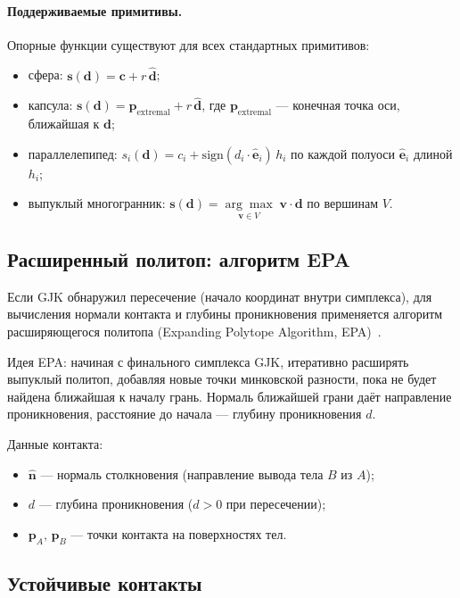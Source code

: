 \paragraph{Поддерживаемые примитивы.}
Опорные функции существуют для всех стандартных примитивов:
\begin{itemize}
  \item сфера: $\mathbf{s}(\mathbf{d}) = \mathbf{c} + r\,\hat{\mathbf{d}}$;
  \item капсула: $\mathbf{s}(\mathbf{d}) = \mathbf{p}_{\text{extremal}} + r\,\hat{\mathbf{d}}$, где $\mathbf{p}_{\text{extremal}}$ — конечная точка оси, ближайшая к $\mathbf{d}$;
  \item параллелепипед: $s_i(\mathbf{d}) = c_i + \text{sign}(d_i \cdot \hat{\mathbf{e}}_i)\,h_i$ по каждой полуоси $\hat{\mathbf{e}}_i$ длиной $h_i$;
  \item выпуклый многогранник: $\mathbf{s}(\mathbf{d}) = \underset{\mathbf{v} \in V}{\arg\max}\; \mathbf{v} \cdot \mathbf{d}$ по вершинам $V$.
\end{itemize}

\subsection{Расширенный политоп: алгоритм EPA}

Если GJK обнаружил пересечение (начало координат внутри симплекса), для вычисления нормали контакта и глубины 
проникновения применяется алгоритм расширяющегося политопа (Expanding Polytope Algorithm, 
EPA)~\cite{bergen2004game}.

Идея EPA: начиная с финального симплекса GJK, итеративно расширять выпуклый политоп, добавляя новые точки 
минковской разности, пока не будет найдена ближайшая к началу грань. Нормаль ближайшей грани даёт направление 
проникновения, расстояние до начала — глубину проникновения $d$.

Данные контакта:

\begin{itemize}
  \item $\hat{\mathbf{n}}$ --- нормаль столкновения (направление вывода тела $B$ из $A$);
  \item $d$ --- глубина проникновения ($d > 0$ при пересечении);
  \item $\mathbf{p}_A,\, \mathbf{p}_B$ --- точки контакта на поверхностях тел.
\end{itemize}

\subsection{Устойчивые контакты}

